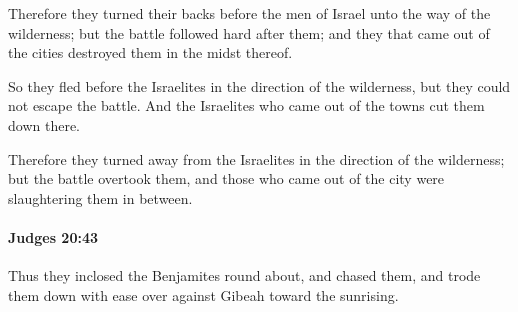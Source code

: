 			\begin{versebox}
					\item[BHS] 
					\item[ASV] Therefore they turned their backs before the men of Israel unto the way of the wilderness; but the battle followed hard after them; and they that came out of the cities destroyed them in the midst thereof.
					\item[NIV] So they fled before the Israelites in the direction of the wilderness, but they could not escape the battle. And the Israelites who came out of the towns cut them down there.
					\item[NRSV] Therefore they turned away from the Israelites in the direction of the wilderness; but the battle overtook them, and those who came out of the city were slaughtering them in between.
			\end{versebox}

		\paragraph{Judges 20:43} %
			\label{JUDGES-20-43}

			Thus they inclosed the Benjamites round about, and chased them, and trode them down with ease over against Gibeah toward the sunrising.

